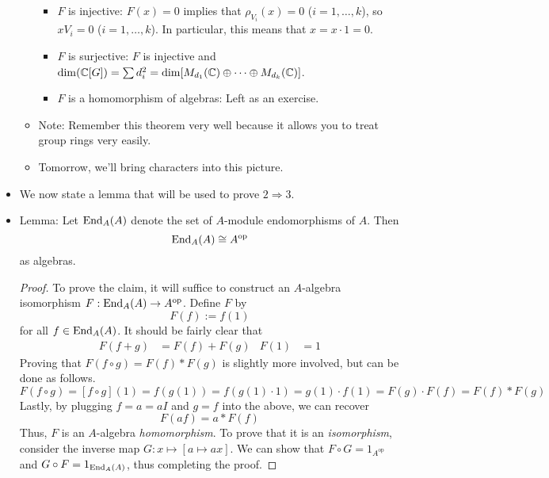 \documentclass[../notes.tex]{subfiles}
\begin{document}
\begin{itemize}
\begin{itemize}
        \begin{itemize}
            \item $F$ is injective: $F(x)=0$ implies that $\rho_{V_i}(x)=0$ ($i=1,\dots,k$), so $xV_i=0$ ($i=1,\dots,k$). In particular, this means that $x=x\cdot 1=0$.
            \item $F$ is surjective: $F$ is injective and $\dim(\mathbb{C}[G])=\sum d_i^2=\dim[M_{d_1}(\mathbb{C})\oplus\cdots\oplus M_{d_k}(\mathbb{C})]$.
            \item $F$ is a homomorphism of algebras: Left as an exercise.
        \end{itemize}
        \item Note: Remember this theorem very well because it allows you to treat group rings very easily.
        \item Tomorrow, we'll bring characters into this picture.
    \end{itemize}
    \item We now state a lemma that will be used to prove $2\Rightarrow 3$.
    \item Lemma: Let $\operatorname{End}_A(A)$ denote the set of $A$-module endomorphisms of $A$. Then
    \begin{equation*}
        \operatorname{End}_A(A) \cong A^\text{op}
    \end{equation*}
    as algebras.
    \begin{proof}
        To prove the claim, it will suffice to construct an $A$-algebra isomorphism $F:\operatorname{End}_A(A)\to A^\text{op}$. Define $F$ by
        \begin{equation*}
            F(f) := f(1)
        \end{equation*}
        for all $f\in\operatorname{End}_A(A)$. It should be fairly clear that
        \begin{align*}
            F(f+g) &= F(f)+F(g)&
            F(1) &= 1
        \end{align*}
        Proving that $F(f\circ g)=F(f)*F(g)$ is slightly more involved, but can be done as follows.
        \begin{equation*}
            F(f\circ g) = [f\circ g](1)
            = f(g(1))
            = f(g(1)\cdot 1)
            = g(1)\cdot f(1)
            = F(g)\cdot F(f)
            = F(f)*F(g)
        \end{equation*}
        Lastly, by plugging $f=a=aI$ and $g=f$ into the above, we can recover
        \begin{equation*}
            F(af) = a*F(f)
        \end{equation*}
        Thus, $F$ is an $A$-algebra \emph{homomorphism}. To prove that it is an \emph{isomorphism}, consider the inverse map $G:x\mapsto[a\mapsto ax]$. We can show that $F\circ G=1_{A^\text{op}}$ and $G\circ F=1_{\operatorname{End}_A(A)}$, thus completing the proof.

\end{proof}
\end{itemize}
\end{document}
